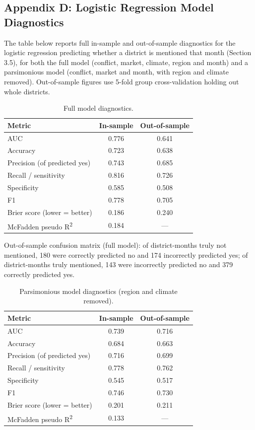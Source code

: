 \documentclass[12pt,a4paper]{article}
\begin{document}
\subsection*{Appendix D: Logistic Regression Model Diagnostics}

The table below reports full in-sample and out-of-sample diagnostics for the logistic regression predicting whether a district is mentioned that month (Section 3.5), for both the full model (conflict, market, climate, region and month) and a parsimonious model (conflict, market and month, with region and climate removed). Out-of-sample figures use 5-fold group cross-validation holding out whole districts.

\begin{table}[h!]
\centering
\begin{tabular}{lcc}
\toprule
\textbf{Metric} & \textbf{In-sample} & \textbf{Out-of-sample} \\
\midrule
AUC & 0.776 & 0.641 \\
Accuracy & 0.723 & 0.638 \\
Precision (of predicted yes) & 0.743 & 0.685 \\
Recall / sensitivity & 0.816 & 0.726 \\
Specificity & 0.585 & 0.508 \\
F1 & 0.778 & 0.705 \\
Brier score (lower = better) & 0.186 & 0.240 \\
McFadden pseudo R\textsuperscript{2} & 0.184 & --- \\
\bottomrule
\end{tabular}
\caption{Full model diagnostics.}
\end{table}

\noindent Out-of-sample confusion matrix (full model): of district-months truly not mentioned, 180 were correctly predicted no and 174 incorrectly predicted yes; of district-months truly mentioned, 143 were incorrectly predicted no and 379 correctly predicted yes.

\begin{table}[h!]
\centering
\begin{tabular}{lcc}
\toprule
\textbf{Metric} & \textbf{In-sample} & \textbf{Out-of-sample} \\
\midrule
AUC & 0.739 & 0.716 \\
Accuracy & 0.684 & 0.663 \\
Precision (of predicted yes) & 0.716 & 0.699 \\
Recall / sensitivity & 0.778 & 0.762 \\
Specificity & 0.545 & 0.517 \\
F1 & 0.746 & 0.730 \\
Brier score (lower = better) & 0.201 & 0.211 \\
McFadden pseudo R\textsuperscript{2} & 0.133 & --- \\
\bottomrule
\end{tabular}
\caption{Parsimonious model diagnostics (region and climate removed).}
\end{table}
\end{document}
